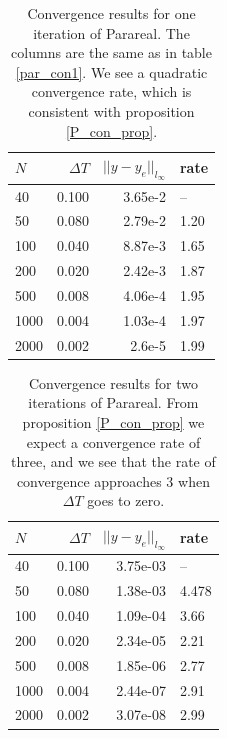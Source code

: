 \begin{table}[h]
\centering
\caption{Convergence results for one iteration of Parareal. The columns are the same as in table \ref{par_con1}. We see a quadratic convergence rate, which is consistent with proposition \ref{P_con_prop}.}
\label{par_con2}
\begin{tabular}{lrrl}
\toprule
{}$N$ &      $\Delta T$ &       $||y-y_e||_{l_{\infty}}$ &     rate \\
\midrule
40   &  0.100 &  3.65e-2 &       -- \\
50   &  0.080 &  2.79e-2 &  1.20 \\
100  &  0.040 &  8.87e-3 &  1.65 \\
200  &  0.020 &  2.42e-3 &  1.87 \\
500  &  0.008 &  4.06e-4 &  1.95 \\
1000 &  0.004 &  1.03e-4 &  1.97 \\
2000 &  0.002 &  2.6e-5 &  1.99 \\
\bottomrule
\end{tabular}
\end{table}
\begin{table}[h]
\centering
\caption{Convergence results for two iterations of Parareal. From proposition \ref{P_con_prop} we expect a convergence rate of three, and we see that the rate of convergence approaches 3 when $\Delta T$ goes to zero.}
\label{par_con3}
\begin{tabular}{lrrl}
\toprule
{}$N$ &      $\Delta T$ &       $||y-y_e||_{l_{\infty}}$ &     rate \\
\midrule
40   &  0.100 &  3.75e-03 &       -- \\
50   &  0.080 &  1.38e-03 &  4.478 \\
100  &  0.040 &  1.09e-04 &   3.66 \\
200  &  0.020 &  2.34e-05 &  2.21 \\
500  &  0.008 &  1.85e-06 &  2.77 \\
1000 &  0.004 &  2.44e-07 &  2.91 \\
2000 &  0.002 &  3.07e-08 &   2.99 \\
\bottomrule
\end{tabular}
\end{table}
